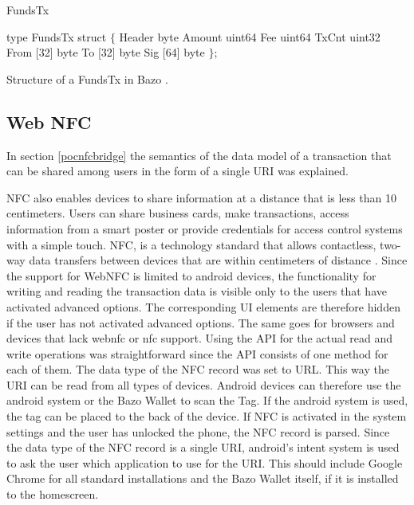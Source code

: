 \begin{algorithm}
\caption{FundsTx}
\label{euclid}
\begin{algorithmic}[1]
\State type FundsTx struct $\{$
\State     Header byte
\State Amount uint64
\State Fee uint64
\State TxCnt uint32
\State From [32] byte
\State To [32] byte
\State Sig [64] byte
\State  $\};$
\end{algorithmic}
\end{algorithm}\label{fig:FundsTX}Structure of a FundsTx in Bazo \cite{lisg}.


\subsection{Web NFC}
In section \ref{pocnfcbridge} the semantics of the data model of a transaction that can be shared among users in the form of a single URI was explained.

NFC also enables devices to share information at a distance that is less than 10 centimeters. Users can share business cards, make transactions, access information from a smart poster or provide credentials for access control systems with a simple touch.
NFC, is a technology standard that allows contactless, two-way data transfers between devices that are within centimeters of distance \cite{nfcforum}.
Since the support for WebNFC is limited to android devices, the functionality for writing and reading the transaction data is visible only to the users that have activated advanced options.
The corresponding UI elements are therefore hidden if the user has not activated advanced options. The same goes for browsers and devices that lack webnfc or nfc support.
Using the API for the actual read and write operations was straightforward since the API consists of one method for each of them. The data type of the NFC record was set to URL.
This way the URI can be read from all types of devices. Android devices can therefore use the android system or the Bazo Wallet to scan the Tag. If the android system is used, the tag can be placed to the back of the device. If NFC is activated in the system settings and the user has unlocked the phone, the NFC record is parsed. Since the data type of the NFC record is a single URI, android's intent system is used to ask the user which application to use for the URI. This should include Google Chrome for all standard installations and the Bazo Wallet itself, if it is installed to the homescreen.


